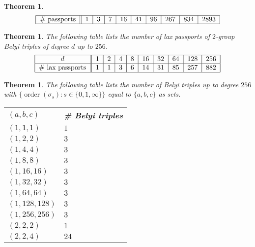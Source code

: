 \documentclass{dcthesis}
\DeclareMathOperator{\order}{order}
\numberwithin{equation}{section}
\newtheorem{theorem}[equation]{Theorem}
\theoremstyle{definition}
\theoremstyle{remark}
\begin{document}
{{\begin{theorem}
\begin{equation}
\begin{tabular}{|c||c|c|c|c|c|c|c|c|c|}
          \hline
          \# passports & $1$ & $3$ & $7$ & $16$ & $41$ & $96$ & $267$ & $834$ & $2893$\\
          \hline
        \end{tabular}
      \end{equation}
    \end{theorem}
    \begin{theorem}\label{thm:laxpassports}
      The following table lists
      the number of lax passports of
      $2$-group Belyi triples
      of degree $d$ up to $256$.
      \begin{equation}
        \label{eqn:}
        \begin{tabular}{|c||c|c|c|c|c|c|c|c|c|}
          \hline
          $d$ & $1$ & $2$ & $4$ & $8$ & $16$ & $32$ & $64$ & $128$ & $256$\\
          \hline
          \# lax passports & $1$ & $1$ & $3$ & $6$ & $14$ & $31$ & $85$ & $257$ & $882$\\
          \hline
        \end{tabular}
      \end{equation}
    \end{theorem}
    \begin{theorem}\label{thm:abc}
      The following table lists
      the number of Belyi triples
      up to degree $256$ with
      $\{\order(\sigma_s) : s\in\{0,1,\infty\}\}$
      equal to $\{a,b,c\}$ as sets.
      \begin{longtable}{|l|l|} 
        \hline
        $(a,b,c)$ & \# Belyi triples \\
        \hline
        \hline
        $(1,1,1)$ & $1$ \\ \hline
        $(1,2,2)$ & $3$ \\ \hline
        $(1,4,4)$ & $3$ \\ \hline
        $(1,8,8)$ & $3$ \\ \hline
        $(1,16,16)$ & $3$ \\ \hline
        $(1,32,32)$ & $3$ \\ \hline
        $(1,64,64)$ & $3$ \\ \hline
        $(1,128,128)$ & $3$ \\ \hline
        $(1,256,256)$ & $3$ \\ \hline
        $(2,2,2)$ & $1$ \\ \hline
        $(2,2,4)$ & $24$ \\ \hline

\end{longtable}
\end{theorem}}}
\end{document}
